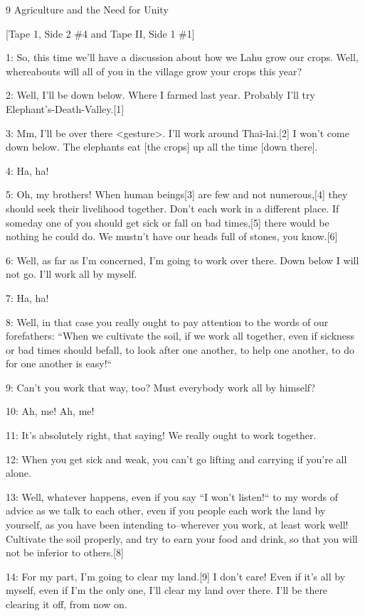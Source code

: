 
{\large{}9 Agriculture and the Need for Unity}

{\large{}[Tape 1,  Side 2 \#4 and Tape II, Side 1 \#1]}

{\large{}1: So, this time we'll have a discussion about how we Lahu grow our crops.
Well, whereabouts will all of you in the village grow your crops this year? }

{\large{}2: Well, I'll be down below. Where I farmed last year. Probably I'll try
Elephant's-Death-Valley.[1]}

{\large{}3: Mm, I'll be over there <gesture>. I'll work around
Thai-lai.[2] I won't come down below. The elephants eat [the crops] up all the
time [down there].}

{\large{}4: Ha, ha! }

{\large{}5: Oh, my brothers! When human beings[3] are few and not numerous,[4]
they should seek their livelihood together. Don't each work in a different place.
If someday one of you should get sick or fall on bad times,[5] there would be nothing
he could do. We mustn't have our heads full of stones, you know.[6]}

{\large{}6: Well, as far as I'm concerned, I'm going to work over there. Down below
I will not go. I'll work all by myself.}

{\large{}7: Ha, ha!}

{\large{}8: Well, in that case you really ought to pay attention to the words of
our forefathers: ``When we cultivate the soil, if we work all together,
even if sickness or bad times should befall, to look after one another, to help
one another, to do for one another is easy!``   }

{\large{}9: Can't you work that way, too? Must everybody work all by himself? }

{\large{}10: Ah, me! Ah, me!}

{\large{}11: It's absolutely right, that saying! We really ought to work together.
}

{\large{}12: When you get sick and weak, you can't go lifting and carrying if you're
all alone.}

{\large{}13: Well, whatever happens, even if you say ``I won't listen!``
to my words of advice as we talk to each other, even if you people each work the
land by yourself, as you have been intending to--wherever you work, at least work
well! Cultivate the soil properly, and try to earn your food and drink, so that
you will not be inferior to others.[8]}

{\large{}14: For my part, I'm going to clear my land.[9] I don't care! Even if
it's all by myself, even if I'm the only one, I'll clear my land over there. I'll
be there clearing it off, from now on.}

